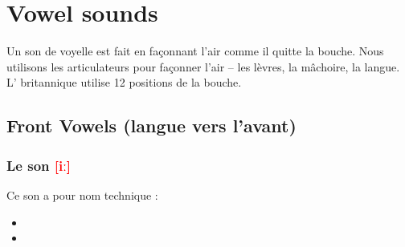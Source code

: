 \chapter{Vowel sounds}
\label{chap:vow}

Un son de voyelle est fait en façonnant l'air comme il quitte la
bouche. Nous utilisons les articulateurs pour façonner l'air -- les
lèvres, la mâchoire, la langue. L' britannique utilise 12 positions de la bouche.

\section{Front Vowels (langue vers l'avant)}
\label{sec:frontvow}



\subsection{Le son  \textcolor{red}{[iː]}}\label{sec:ilong}

Ce son a pour nom technique :

\begin{itemize}
\item {}
\item {}
\end{itemize}

\indicsound


